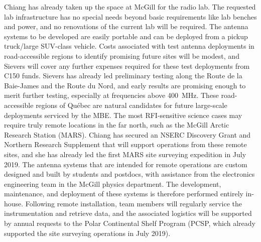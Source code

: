 \documentclass[11pt]{article}
\makeatletter
\newcommand{\mbe}{{\rm MBE}}
\def\section{\@startsection {section}{1}{\z@}{1.0ex plus 
1ex minus .2ex}{.2ex plus .2ex}{\large\bf}}
\makeatother
\begin{document}
Chiang has already taken up the space at McGill for the radio lab.
The requested lab infrastructure has no special needs beyond basic
requirements like lab benches and power, and no renovations of the
current lab will be required.  The antenna systems to be developed are
easily portable and can be deployed from a pickup truck/large
SUV-class vehicle.  Costs associated with test antenna deployments in
road-accessible regions to identify promising future sites will be
modest, and Sievers will cover any further expenses required for these
test deployments from C150 funds.  Sievers has already led preliminary
testing along the Route de la Baie-James and the Route du Nord, and
early results are promising enough to merit further testing,
especially at frequencies above 400~MHz.  These road-accessible
regions of Qu\'ebec are natural candidates for future large-scale
deployments serviced by the \mbe.  The most RFI-sensitive science
cases may require truly remote locations in the far north, such as the
McGill Arctic Research Station (MARS).  Chiang has secured an NSERC
Discovery Grant and Northern Research Supplement that will support
operations from these remote sites, and she has already led the first
MARS site surveying expedition in July 2019.  The antenna systems that
are intended for remote operations are custom designed and built by
students and postdocs, with assistance from the electronics
engineering team in the McGill physics department.  The development,
maintenance, and deployment of these systems is therefore performed
entirely in-house.  Following remote installation, team members will
regularly service the instrumentation and retrieve data, and the
associated logistics will be supported by annual requests to the Polar
Continental Shelf Program (PCSP, which already supported the site
surveying operations in July 2019).

\section{Benefits to Canada}
\end{document}
